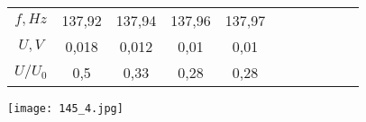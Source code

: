 \documentclass[a4paper, 12pt]{article}%
\begin{document}
\begin{enumerate}
\begin{center}
\begin{tabular}{|c|c|c|c|c|cccccc}
$f, Hz$ & 137,92 & 137,94 & 137,96 & 137,97 &                             &                             &                             &                             &                             &                             \\ \cline{1-5}
$U, V$  & 0,018  & 0,012  & 0,01   & 0,01   &                             &                             &                             &                             &                             &                             \\ \cline{1-5}
$U/U_0$ & 0,5    & 0,33   & 0,28   & 0,28   &                             &                             &                             &                             &                             &                             \\ \cline{1-5}
\end{tabular}
\end{center}

\texttt{[image: 145\_4.jpg]}
\end{enumerate}
\end{document}
